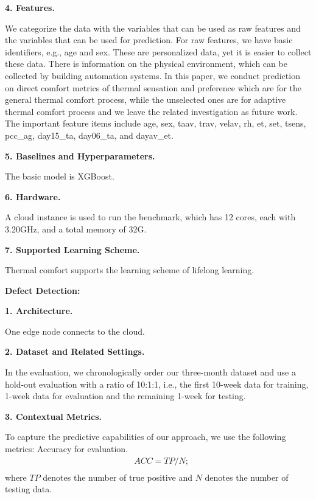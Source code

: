 \textbf{4. Features.}

We categorize the data with the variables that can be used as raw features and the variables that can be used for prediction. For raw features, we have basic identifiers, e.g., age and sex. These are personalized data, yet it is easier to collect these data. There is information on the physical environment, which can be collected by building automation systems. In this paper, we conduct prediction on direct comfort metrics of thermal sensation and preference which are for the general thermal comfort process, while the unselected ones are for adaptive thermal comfort process and we leave the related investigation as future work. The important feature items include age, sex, taav, trav, velav, rh, et, set, tsens, pcc\_ag, day15\_ta, day06\_ta, and dayav\_et. 

\textbf{5. Baselines and Hyperparameters.}

The basic model is XGBoost.

\textbf{6. Hardware.}

A cloud instance is used to run the benchmark, which has 12 cores, each with 3.20GHz, and a total memory of 32G.

\textbf{7. Supported Learning Scheme.}

Thermal comfort supports the learning scheme of lifelong learning. 
 
\vspace{0.2cm} \noindent
\textbf{Defect Detection:}

\textbf{1. Architecture.}

One edge node connects to the cloud. 

\textbf{2. Dataset and Related Settings.}

In the evaluation, we chronologically order our three-month dataset and use a hold-out evaluation with a ratio of 10:1:1, i.e., the first 10-week data for training, 1-week data for evaluation and the remaining 1-week for testing.

\textbf{3. Contextual Metrics.}

To capture the predictive capabilities of our approach, we use the following metrics: Accuracy for evaluation.
\noindent
\begin{equation*}
\begin{split}
&ACC = TP / N; \\
\end{split}
\end{equation*}
where $TP$ denotes the number of true positive and $N$ denotes the number of testing data. 

